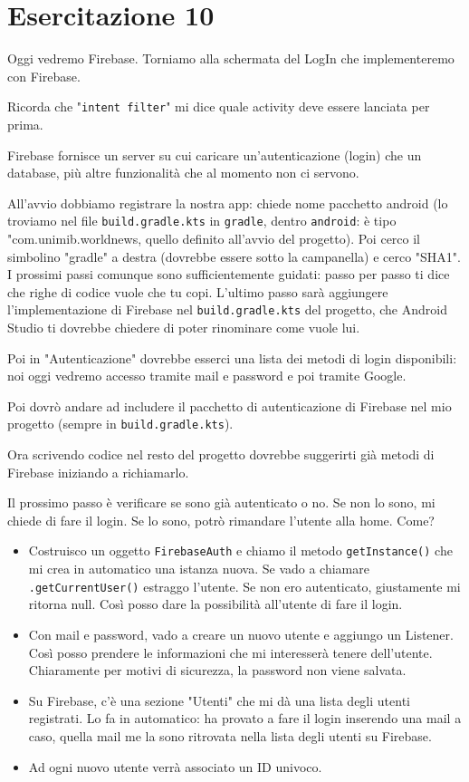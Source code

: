 
\chapter{Esercitazione 10}
\par Oggi vedremo Firebase. Torniamo alla schermata del LogIn che implementeremo con Firebase.
\par Ricorda che "\texttt{intent filter}" mi dice quale activity deve essere lanciata per prima.
\par Firebase fornisce un server su cui caricare un'autenticazione (login) che un database, più altre funzionalità che al momento non ci servono.
\par All'avvio dobbiamo registrare la nostra app: chiede nome pacchetto android (lo troviamo nel file \texttt{build.gradle.kts} in \texttt{gradle}, dentro \texttt{android}: è tipo "com.unimib.worldnews, quello definito all'avvio del progetto). Poi cerco il simbolino "gradle" a destra (dovrebbe essere sotto la campanella) e cerco "SHA1". I prossimi passi comunque sono sufficientemente guidati: passo per passo ti dice che righe di codice vuole che tu copi. L'ultimo passo sarà aggiungere l'implementazione di Firebase nel \texttt{build.gradle.kts} del progetto, che Android Studio ti dovrebbe chiedere di poter rinominare come vuole lui.
\par Poi in "Autenticazione" dovrebbe esserci una lista dei metodi di login disponibili: noi oggi vedremo accesso tramite mail e password e poi tramite Google.
\par Poi dovrò andare ad includere il pacchetto di autenticazione di Firebase nel mio progetto (sempre in \texttt{build.gradle.kts}).
\par Ora scrivendo codice nel resto del progetto dovrebbe suggerirti già metodi di Firebase iniziando a richiamarlo.
\par Il prossimo passo è verificare se sono già autenticato o no. Se non lo sono, mi chiede di fare il login. Se lo sono, potrò rimandare l'utente alla home. Come?
\begin{itemize}
    \item Costruisco un oggetto \texttt{FirebaseAuth} e chiamo il metodo \texttt{getInstance()} che mi crea in automatico una istanza nuova. Se vado a chiamare \texttt{.getCurrentUser()} estraggo l'utente. Se non ero autenticato, giustamente mi ritorna null. Così posso dare la possibilità all'utente di fare il login.
    \item Con mail e password, vado a creare un nuovo utente e aggiungo un Listener. Così posso prendere le informazioni che mi interesserà tenere dell'utente. Chiaramente per motivi di sicurezza, la password non viene salvata.
    \item Su Firebase, c'è una sezione "Utenti" che mi dà una lista degli utenti registrati. Lo fa in automatico: ha provato a fare il login inserendo una mail a caso, quella mail me la sono ritrovata nella lista degli utenti su Firebase.
    \item Ad ogni nuovo utente verrà associato un ID univoco.
\end{itemize}
